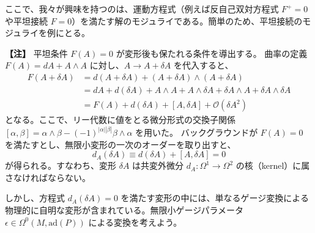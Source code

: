 \documentclass[uplatex, dvipdfmx, book]{jsbook}
\newenvironment{note}{\vspace{1ex}\par\footnotesize\noindent\textbf{【注】}}{\par\vspace{1ex}}
\begin{document}
ここで、我々が興味を持つのは、運動方程式（例えば反自己双対方程式 $F^+ = 0$ や平坦接続 $F = 0$）を満たす解のモジュライである。簡単のため、平坦接続のモジュライを例にとる。

\begin{note}
平坦条件 $F(A) = 0$ が変形後も保たれる条件を導出する。
曲率の定義 $F(A) = dA + A \wedge A$ に対し、$A \to A + \delta A$ を代入すると、
\begin{align*}
F(A + \delta A) &= d(A + \delta A) + (A + \delta A) \wedge (A + \delta A) \\
&= dA + d(\delta A) + A \wedge A + A \wedge \delta A + \delta A \wedge A + \delta A \wedge \delta A \\
&= F(A) + d(\delta A) + [A, \delta A] + \mathcal{O}(\delta A^2)
\end{align*}
となる。ここで、リー代数に値をとる微分形式の交換子関係 $[\alpha, \beta] = \alpha \wedge \beta - (-1)^{|\alpha||\beta|} \beta \wedge \alpha$ を用いた。
バックグラウンドが $F(A) = 0$ を満たすとし、無限小変形の一次のオーダーを取り出すと、
\begin{equation}
    d_A (\delta A) \equiv d(\delta A) + [A, \delta A] = 0
\end{equation}
が得られる。すなわち、変形 $\delta A$ は共変外微分 $d_A: \Omega^1 \to \Omega^2$ の核（kernel）に属さなければならない。
\end{note}

しかし、方程式 $d_A(\delta A) = 0$ を満たす変形の中には、単なるゲージ変換による物理的に自明な変形が含まれている。無限小ゲージパラメータ $\epsilon \in \Omega^0(M, \mathrm{ad}(P))$ による変換を考えよう。
\end{document}
